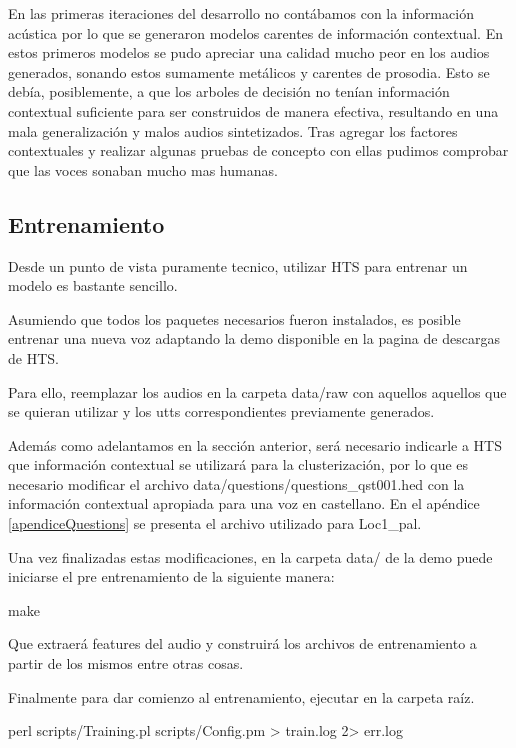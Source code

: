En las primeras iteraciones del desarrollo no contábamos con la información acústica por lo que se generaron modelos carentes de información contextual. En estos primeros modelos se pudo apreciar una calidad mucho peor en los audios generados, sonando estos sumamente metálicos y carentes de prosodia. Esto se debía, posiblemente, a que los arboles de decisión no tenían información contextual suficiente para ser construidos de manera efectiva, resultando en una mala generalización y malos audios sintetizados. Tras agregar los factores contextuales y realizar algunas pruebas de concepto con ellas pudimos comprobar que las voces sonaban mucho mas humanas.


\subsection{Entrenamiento} \label{entrenamientoHTS}

Desde un punto de vista puramente tecnico, utilizar HTS para entrenar un modelo es bastante sencillo.

Asumiendo que todos los paquetes necesarios fueron instalados, es posible entrenar una nueva voz adaptando la demo disponible en la pagina de descargas de HTS.

Para ello, reemplazar los audios en la carpeta data/raw con aquellos aquellos que se quieran utilizar y los utts correspondientes previamente generados. 

Además como adelantamos en la sección anterior, será necesario indicarle a HTS que información contextual se utilizará para la clusterización, por lo que es necesario modificar el archivo data/questions/questions\_qst001.hed con la información contextual apropiada para una voz en castellano. En el apéndice \ref{apendiceQuestions} se presenta el archivo utilizado para Loc1\_pal.

Una vez finalizadas estas modificaciones, en la carpeta data/ de la demo puede iniciarse el pre entrenamiento de la siguiente manera:

\begin{tcolorbox}
make
\end{tcolorbox}

Que extraerá features del audio y construirá los archivos de entrenamiento a partir de los mismos entre otras cosas.

Finalmente para dar comienzo al entrenamiento, ejecutar en la carpeta raíz.

\begin{tcolorbox}
perl scripts/Training.pl scripts/Config.pm > train.log 2> err.log
\end{tcolorbox}

